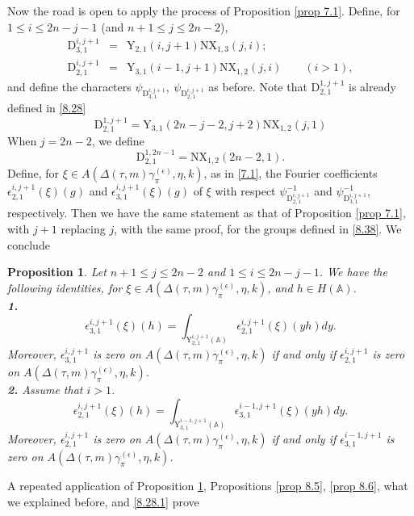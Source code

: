 \documentclass[12pts]{amsart}
\newcommand{\BA}{{\mathbb {A}}}
\newtheorem{prop}[thm]{Proposition}
\begin{document}
Now the road is open to apply the process of Proposition \ref{prop
	7.1}. Define, for $1\leq i\leq 2n-j-1$ (and $n+1\leq j\leq 2n-2$),
\begin{equation}\label{8.38}
\begin{array}{rcl}
\mathrm{D}_{3,1}^{i,j+1}&=&\mathrm{Y}_{2,1}(i,j+1)\mathrm{N}\mathrm{X}_{1,3}(j,i);\\
\mathrm{D}_{2,1}^{i,j+1}&=&\mathrm{Y}_{3,1}(i-1,j+1)\mathrm{N}\mathrm{X}_{1,2}(j,i)\qquad
(i>1),
\end{array}
\end{equation}
and define the characters $\psi_{\mathrm{D}_{3,1}^{i,j+1}},\
\psi_{\mathrm{D}_{2,1}^{i,j+1}}$ as before. Note that
$\mathrm{D}_{2,1}^{1,j+1}$ is already defined in \eqref{8.28}
$$
\mathrm{D}_{2,1}^{1,j+1}=\mathrm{Y}_{3,1}(2n-j-2,j+2)\mathrm{N}\mathrm{X}_{1,2}(j,1)
$$
When $j=2n-2$, we define
$$
\mathrm{D}_{2,1}^{1,2n-1}=\mathrm{N}\mathrm{X}_{1,2}(2n-2,1).
$$
Define, for $\xi \in A(\Delta(\tau,m)\gamma_\pi^{(\epsilon)},\eta,k)$,  as in \eqref{7.1}, the Fourier coefficients $\epsilon_{2,1}^{i,j+1}(\xi)(g)$ and
$\epsilon_{3,1}^{i,j+1}(\xi)(g)$ of $\xi$ with respect
$\psi_{\mathrm{D}_{2,1}^{i,j+1}}^{-1}$ and
$\psi_{\mathrm{D}_{3,1}^{i,j+1}}^{-1}$, respectively. Then we have the same
statement as that of Proposition \ref{prop 7.1}, with $j+1$
replacing $j$, with the same proof, for the groups defined in
\eqref{8.38}. We conclude
\begin{prop}\label{prop 8.7}
	Let $n+1\leq j\leq 2n-2$ and $1\leq i\leq 2n-j-1$. We have the following identities, for $\xi\in A(\Delta(\tau,m)\gamma_\pi^{(\epsilon)},\eta,k)$, and $h\in H(\BA)$.\\
	{\bf 1.} 
	$$
	\epsilon_{3,1}^{i,j+1}(\xi)(h)=\int_{\mathrm{Y}_{2,1}^{i,j+1}(\BA)}\epsilon_{2,1}^{i,j+1}(\xi)(yh)dy.
	$$
	Moreover, $\epsilon_{3,1}^{i,j+1}$ is zero on $A(\Delta(\tau,m)\gamma_\pi^{(\epsilon)},\eta,k)$ if and
	only if $\epsilon_{2,1}^{i,j+1}$ is zero on $A(\Delta(\tau,m)\gamma_\pi^{(\epsilon)},\eta,k)$.\\
	{\bf 2.} Assume that $i>1$. 
	$$
	\epsilon_{2,1}^{i,j+1}(\xi)(h)=\int_{\mathrm{Y}_{3,1}^{i-1,j+1}(\BA)}\epsilon_{3,1}^{i-1,j+1}(\xi)(yh)dy.
	$$
	Moreover, $\epsilon_{2,1}^{i,j+1}$ is zero on
	$A(\Delta(\tau,m)\gamma_\pi^{(\epsilon)},\eta,k)$ if and only if $\epsilon_{3,1}^{i-1,j+1}$ is zero on 	$A(\Delta(\tau,m)\gamma_\pi^{(\epsilon)},\eta,k)$.
\end{prop}
A repeated application of Proposition \ref{prop 8.7}, Propositions
\ref{prop 8.5}, \ref{prop 8.6}, what we explained before, and \eqref{8.28.1} prove
\end{document}
